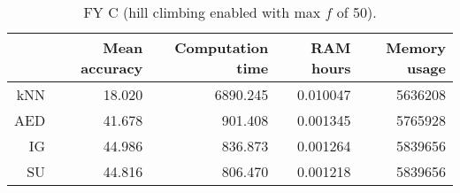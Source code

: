 \begin{table}[h]
\centering
\begin{tabular}{r|rrrr}
    & Mean accuracy & Computation time & RAM hours & Memory usage \\ \hline
kNN & 18.020                   & 6890.245         & 0.010047  & 5636208      \\
AED & 41.678                   & 901.408          & 0.001345  & 5765928      \\
IG  & 44.986                   & 836.873          & 0.001264  & 5839656      \\
SU  & 44.816                   & 806.470          & 0.001218  & 5839656     
\end{tabular}
\caption{FY C (hill climbing enabled with max $f$ of 50).}
\label{Table:FY_C_H}
\end{table}
